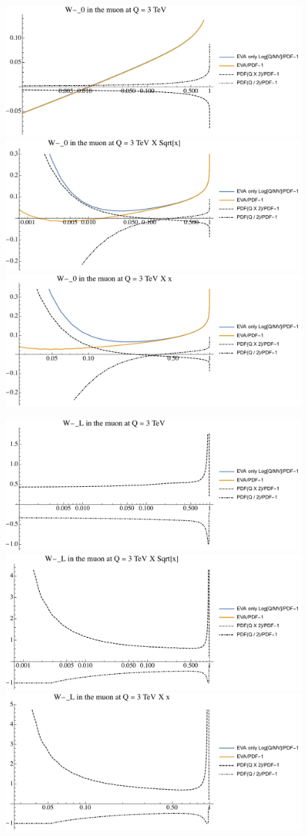 \documentclass[a4paper,11pt]{article}
\begin{document}
\begin{figure}[ht]
\includegraphics[width=0.46\linewidth]{Notebooks/PlotPDFs/ratios/3TeV/W-_0_Q.pdf}
\includegraphics[width=0.46\linewidth]{Notebooks/PlotPDFs/ratios/3TeV/W-_0_Qsqrtx.pdf}
\includegraphics[width=0.46\linewidth]{Notebooks/PlotPDFs/ratios/3TeV/W-_0_Qx.pdf}
\end{figure}

\begin{figure}[ht]
\includegraphics[width=0.46\linewidth]{Notebooks/PlotPDFs/ratios/3TeV/W-_L_Q.pdf}
\includegraphics[width=0.46\linewidth]{Notebooks/PlotPDFs/ratios/3TeV/W-_L_Qsqrtx.pdf}
\includegraphics[width=0.46\linewidth]{Notebooks/PlotPDFs/ratios/3TeV/W-_L_Qx.pdf}
\end{figure}
\end{document}

